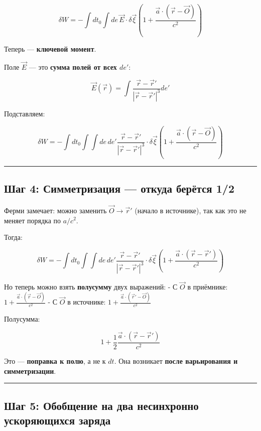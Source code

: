 \documentclass[11pt]{article}
\begin{document}
\[
\delta W = - \int dt_0 \int de \, \vec{E} \cdot \delta \vec{\xi} \left( 1 + \frac{\vec{a} \cdot (\vec{r} - \vec{O})}{c^2} \right)
\]

Теперь --- \textbf{ключевой момент}.

Поле \(\vec{E}\) --- это \textbf{сумма полей от всех \(de'\)}:

\[
\vec{E}(\vec{r}) = \int \frac{\vec{r} - \vec{r}'}{|\vec{r} - \vec{r}'|^3} de'
\]

Подставляем:

\[
\delta W = - \int dt_0 \int \int de \, de' \frac{\vec{r} - \vec{r}'}{|\vec{r} - \vec{r}'|^3} \cdot \delta \vec{\xi} \left( 1 + \frac{\vec{a} \cdot (\vec{r} - \vec{O})}{c^2} \right)
\]

\begin{center}\rule{0.5\linewidth}{\linethickness}\end{center}

\subsection{Шаг 4: Симметризация --- откуда берётся 1/2}

Ферми замечает: можно заменить \(\vec{O} \to \vec{r}'\) (начало в
источнике), так как это не меняет порядка по \(a/c^2\).

Тогда:

\[
\delta W = - \int dt_0 \int \int de \, de' \frac{\vec{r} - \vec{r}'}{|\vec{r} - \vec{r}'|^3} \cdot \delta \vec{\xi} \left( 1 + \frac{\vec{a} \cdot (\vec{r} - \vec{r}')}{c^2} \right)
\]

Но теперь можно взять \textbf{полусумму} двух выражений: - С \(\vec{O}\)
в приёмнике: \(1 + \frac{\vec{a} \cdot (\vec{r} - \vec{O})}{c^2}\) - С
\(\vec{O}\) в источнике:
\(1 + \frac{\vec{a} \cdot (\vec{r}' - \vec{O})}{c^2}\)

Полусумма:

\[
1 + \frac{1}{2} \frac{\vec{a} \cdot (\vec{r} - \vec{r}')}{c^2}
\]

 Это --- \textbf{поправка к полю}, а не к \(dt\). Она возникает
\textbf{после варьирования и симметризации}.

\begin{center}\rule{0.5\linewidth}{\linethickness}\end{center}

\subsection{ Шаг 5: Обобщение на два несинхронно ускоряющихся заряда}
\end{document}
